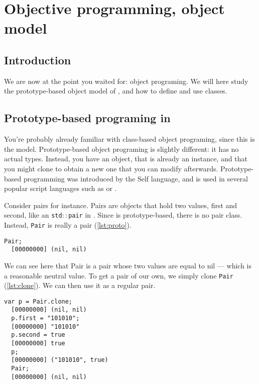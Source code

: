 \documentclass[openright,twoside,12pt]{report}
\begin{document}

\chapter{Objective programming, \urbi object model}
\label{section:objective}


\section{Introduction}

We are now at the point you waited for: object programing. We will
here study the prototype-based object model of \urbi, and how to
define and use classes.

\section{Prototype-based programing in \urbi}

You're probably already familiar with class-based object programing,
since this is the \Cxx model. Prototype-based object programing is
slightly different: it has no actual types. Instead, you have an
object, that is already an instance, and that you might clone to
obtain a new one that you can modify afterwards. Prototype-based
programming was introduced by the Self language, and is used in
several popular script languages such as \io or \js.

Consider pairs for instance. Pairs are objects that hold two values,
first and second, like an \texttt{std$::$pair} in \Cxx. Since \urbi is
prototype-based, there is no pair class. Instead, \lstinline|Pair| is
really a pair (\autoref{lst:proto}).

\begin{lstlisting}[caption=Prototypes in \urbi, label=lst:proto]
  Pair;
  [00000000] (nil, nil)
\end{lstlisting}

We can see here that Pair is a pair whose two values are equal to nil
--- which is a reasonable neutral value. To get a pair of our own, we
simply clone \lstinline|Pair| (\autoref{lst:clone}). We can then use it as a
regular pair.

\begin{lstlisting}[caption=Cloning, label=lst:clone]
  var p = Pair.clone;
  [00000000] (nil, nil)
  p.first = "101010";
  [00000000] "101010"
  p.second = true
  [00000000] true
  p;
  [00000000] ("101010", true)
  Pair;
  [00000000] (nil, nil)
\end{lstlisting}
\end{document}
